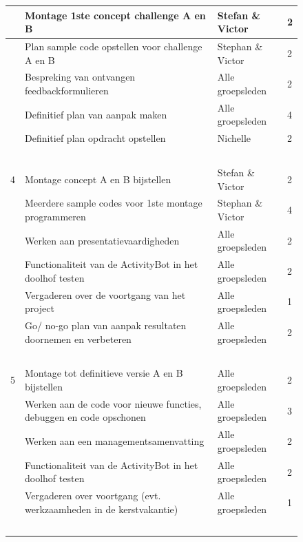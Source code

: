 \documentclass[oneside]{book}
\begin{document}
\begin{figure}[H]
\begin{adjustwidth}{-4.25cm}{}
\begin{tabular}{ | l | l | l | l | }
	 & Montage 1ste concept challenge A en B & Stefan \& Victor & 2 \\ \hline
	 & Plan sample code opstellen voor challenge A en B & Stephan \& Victor & 2 \\ \hline
	 & Bespreking van ontvangen feedbackformulieren & Alle groepsleden & 2 \\ \hline
	 & Definitief plan van aanpak maken & Alle groepsleden & 4 \\ \hline
	 & Definitief plan opdracht opstellen & Nichelle & 2 \\ \hline
	 & \  & \  & \  \\ \hline
	4 & Montage concept A en B bijstellen & Stefan \& Victor & 2 \\ \hline
	 & Meerdere sample codes voor 1ste montage programmeren & Stephan \& Victor & 4 \\ \hline
	 & Werken aan presentatievaardigheden & Alle groepsleden & 2 \\ \hline
	 & Functionaliteit van de ActivityBot in het doolhof testen & Alle groepsleden & 2 \\ \hline
	 & Vergaderen over de voortgang van het project & Alle groepsleden & 1 \\ \hline
	 & Go/ no-go plan van aanpak resultaten doornemen en verbeteren & Alle groepsleden & 2 \\ \hline
	 & \  & \  & \  \\ \hline
	5 & Montage tot definitieve versie A en B bijstellen & Alle groepsleden & 2 \\ \hline
	 & Werken aan de code voor nieuwe functies, debuggen en code opschonen & Alle groepsleden & 3 \\ \hline
	 & Werken aan een managementsamenvatting & Alle groepsleden & 2 \\ \hline
	 & Functionaliteit van de ActivityBot in het doolhof testen & Alle groepsleden & 2 \\ \hline
	 & Vergaderen over voortgang (evt. werkzaamheden in de kerstvakantie) & Alle groepsleden & 1 \\ \hline
	 & \  & \  & \  \\ \hline
	\end{tabular}
	\end{adjustwidth}\end{figure}
	\clearpage
\end{document}
